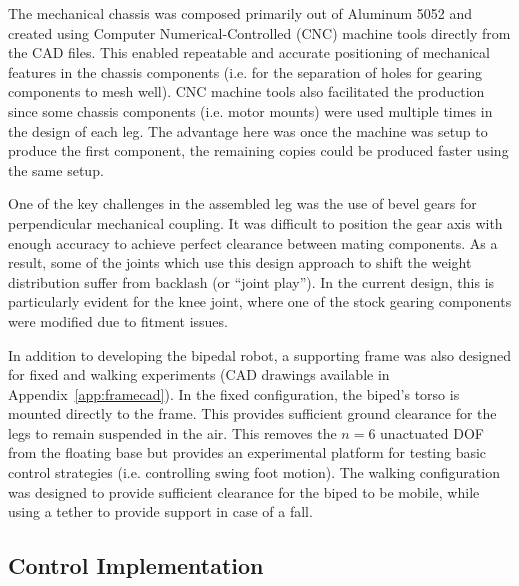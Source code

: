 The mechanical chassis was composed primarily out of Aluminum 5052 and created using Computer Numerical-Controlled (CNC) machine tools directly from the CAD files. This enabled repeatable and accurate positioning of mechanical features in the chassis components (i.e. for the separation of holes for gearing components to mesh well). CNC machine tools also facilitated the production since some chassis components (i.e. motor mounts) were used multiple times in the design of each leg. The advantage here was once the machine was setup to produce the first component, the remaining copies could be produced faster using the same setup. 

One of the key challenges in the assembled leg was the use of bevel gears for perpendicular mechanical coupling. It was difficult to position the gear axis with enough accuracy to achieve perfect clearance between mating components. As a result, some of the joints which use this design approach to shift the weight distribution suffer from backlash (or ``joint play''). In the current design, this is particularly evident for the knee joint, where one of the stock gearing components were modified due to fitment issues. 

In addition to developing the bipedal robot, a supporting frame was also designed for fixed and walking experiments (CAD drawings available in Appendix~\ref{app:framecad}). In the fixed configuration, the biped's torso is mounted directly to the frame. This provides sufficient ground clearance for the legs to remain suspended in the air. This removes the $n = 6$ unactuated DOF from the floating base but provides an experimental platform for testing basic control strategies (i.e. controlling swing foot motion). The walking configuration was designed to provide sufficient clearance for the biped to be mobile, while using a tether to provide support in case of a fall. 

\subsection{Control Implementation} %
\label{sub:control_implementation}

